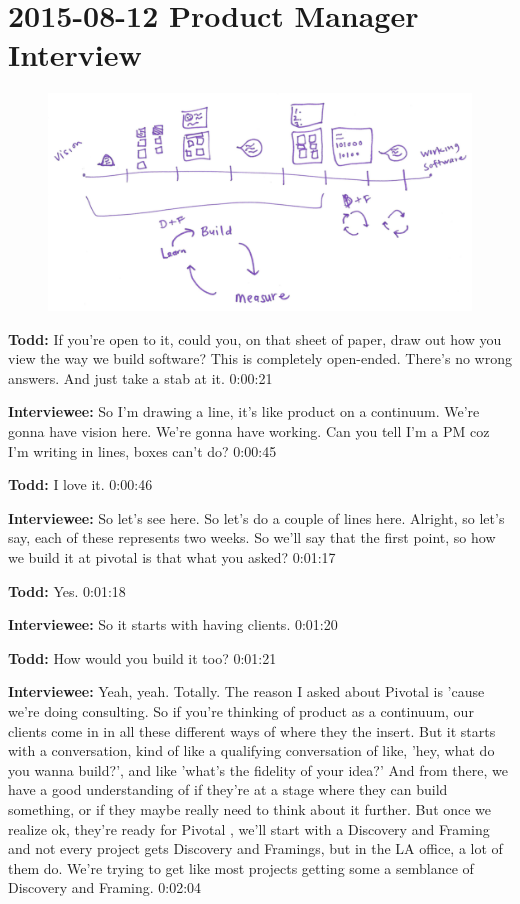 \section{2015-08-12 Product Manager Interview}

\begin{figure}[h]
\centering
\includegraphics[width=6.5in]{interviews/drawings/2015_08_12_pm.png}
\caption{}
\label{2015_08_12_pm}
\end{figure}


\textbf{Todd:} If you're open to it, could you, on that sheet of paper, draw out how you view the way we build software? This is completely open-ended. There's no wrong answers. And just take a stab at it.  0:00:21

\textbf{Interviewee:} So I'm drawing a line, it's like product on a continuum. We're gonna have vision here. We're gonna have working. Can you tell I'm a PM coz I'm writing in lines, boxes can't do? 0:00:45

\textbf{Todd:} I love it.  0:00:46

\textbf{Interviewee:} So let's see here. So let's do a couple of lines here. Alright, so let's say, each of these represents two weeks.  So we'll say that the first point, so how we build it at pivotal is that what you asked?  0:01:17

\textbf{Todd:} Yes.  0:01:18

\textbf{Interviewee:} So it starts with having clients.  0:01:20

\textbf{Todd:} How would you build it too?  0:01:21

\textbf{Interviewee:} Yeah, yeah. Totally. The reason I asked about Pivotal is 'cause we're doing consulting. So if you're thinking of product as a continuum, our clients come in in all these different ways of where they the insert. But it starts with a conversation, kind of like a qualifying conversation of like, 'hey, what do you wanna build?', and like 'what's the fidelity of your idea?' And from there, we have a good understanding of if they're at a stage where they can build something, or if they maybe really need to think about it further.  But once we realize ok, they're ready for Pivotal , we'll start with a Discovery and Framing and not every project gets Discovery and Framings, but in the LA office, a lot of them do.  We're trying to get like most projects getting some a semblance of Discovery and Framing.   0:02:04

